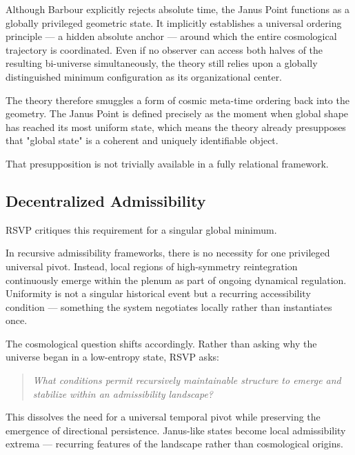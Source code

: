 \documentclass[12pt, a4paper]{article}
\begin{document}
Although Barbour explicitly rejects absolute time, the Janus Point functions
as a globally privileged geometric state. It implicitly establishes a
universal ordering principle — a hidden absolute anchor — around which the
entire cosmological trajectory is coordinated. Even if no observer can access
both halves of the resulting bi-universe simultaneously, the theory still
relies upon a globally distinguished minimum configuration as its
organizational center.

The theory therefore smuggles a form of cosmic meta-time ordering back into
the geometry. The Janus Point is defined precisely as the moment when global
shape has reached its most uniform state, which means the theory already
presupposes that "global state" is a coherent and uniquely identifiable
object.

That presupposition is not trivially available in a fully relational framework.

\subsection{Decentralized Admissibility}

RSVP critiques this requirement for a singular global minimum.

In recursive admissibility frameworks, there is no necessity for one
privileged universal pivot. Instead, local regions of high-symmetry
reintegration continuously emerge within the plenum as part of ongoing
dynamical regulation. Uniformity is not a singular historical event but a
recurring accessibility condition — something the system negotiates locally
rather than instantiates once.

The cosmological question shifts accordingly. Rather than asking why the
universe began in a low-entropy state, RSVP asks:

\begin{quote}
\itshape
What conditions permit recursively maintainable structure to emerge and
stabilize within an admissibility landscape?
\end{quote}

This dissolves the need for a universal temporal pivot while preserving the
emergence of directional persistence. Janus-like states become local
admissibility extrema — recurring features of the landscape rather than
cosmological origins.
\end{document}
